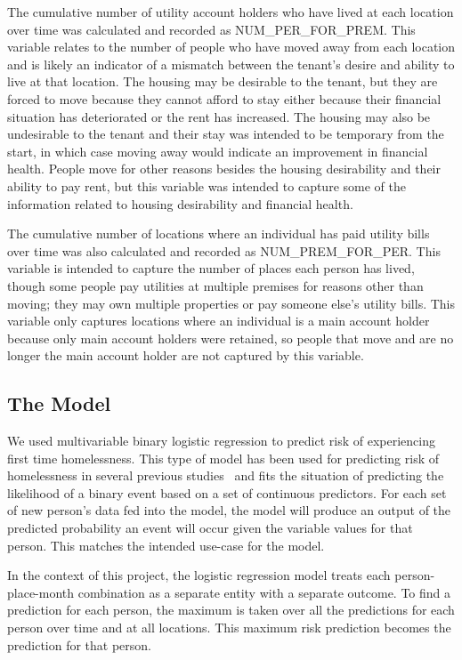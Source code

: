 \documentclass[10pt,letterpaper]{article}
\begin{document}
The cumulative number of utility account holders who have lived at each location over time was calculated and recorded as NUM\_PER\_FOR\_PREM. This variable relates to the number of people who have moved away from each location and is likely an indicator of a mismatch between the tenant's desire and ability to live at that location. The housing may be desirable to the tenant, but they are forced to move because they cannot afford to stay either because their financial situation has deteriorated or the rent has increased. The housing may also be undesirable to the tenant and their stay was intended to be temporary from the start, in which case moving away would indicate an improvement in financial health. People move for other reasons besides the housing desirability and their ability to pay rent, but this variable was intended to capture some of the information related to housing desirability and financial health.

The cumulative number of locations where an individual has paid utility bills over time was also calculated and recorded as NUM\_PREM\_FOR\_PER. This variable is intended to capture the number of places each person has lived, though some people pay utilities at multiple premises for reasons other than moving; they may own multiple properties or pay someone else's utility bills. This variable only captures locations where an individual is a main account holder because only main account holders were retained, so people that move and are no longer the main account holder are not captured by this variable.

\subsection*{The Model}
We used multivariable binary logistic regression to predict risk of experiencing first time homelessness. This type of model has been used for predicting risk of homelessness in several previous studies~\cite{byrne2020classification,van2009longitudinal,flaming2011crisis, hong2018applications,toros2019early} and fits the situation of predicting the likelihood of a binary event based on a set of continuous predictors. For each set of new person's data fed into the model, the model will produce an output of the predicted probability an event will occur given the variable values for that person. This matches the intended use-case for the model. 

In the context of this project, the logistic regression model treats each person-place-month combination as a separate entity with a separate outcome. To find a prediction for each person, the maximum is taken over all the predictions for each person over time and at all locations. This maximum risk prediction becomes the prediction for that person.
\end{document}
